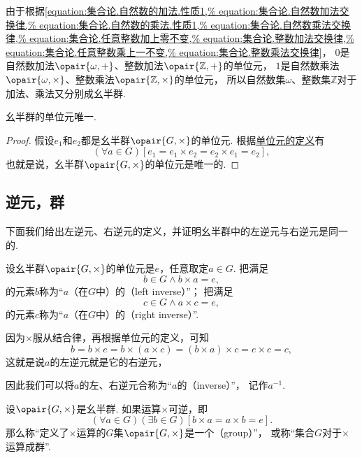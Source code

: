 由于根据\cref{equation:集合论.自然数的加法.性质1,%
equation:集合论.自然数加法交换律,%
equation:集合论.自然数的乘法.性质1,%
equation:集合论.自然数乘法交换律,%
equation:集合论.任意整数加上零不变,%
equation:集合论.整数加法交换律,%
equation:集合论.任意整数乘上一不变,%
equation:集合论.整数乘法交换律}，
\(0\)是自然数加法\(\opair{\omega,+}\)、整数加法\(\opair{\mathbb{Z},+}\)的单位元，
\(1\)是自然数乘法\(\opair{\omega,\times}\)、整数乘法\(\opair{\mathbb{Z},\times}\)的单位元，
所以自然数集\(\omega\)、整数集\(\mathbb{Z}\)对于加法、乘法又分别成幺半群.

\begin{theorem}\label{theorem:抽象代数.幺半群的单位元唯一}
幺半群的单位元唯一.
\begin{proof}
假设\(e_1\)和\(e_2\)都是幺半群\(\opair{G,\times}\)的单位元.
根据\hyperref[definition:抽象代数.幺半群的定义]{单位元的定义}有\[
	(\forall a \in G)[
		e_1 = e_1 \times e_2 = e_2 \times e_1 = e_2
	],
\]
也就是说，幺半群\(\opair{G,\times}\)的单位元是唯一的.
\end{proof}
\end{theorem}

\subsection{逆元，群}
下面我们给出左逆元、右逆元的定义，并证明幺半群中的左逆元与右逆元是同一的.

设幺半群\(\opair{G,\times}\)的单位元是\(e\)，任意取定\(a \in G\).
把满足\[
	b \in G
	\land
	b \times a = e,
\]的元素\(b\)称为“\(a\)（在\(G\)中）的（left inverse）”；
把满足\[
	c \in G
	\land
	a \times c = e,
\]的元素\(c\)称为“\(a\)（在\(G\)中）的（right inverse）”.

因为\(\times\)服从结合律，再根据单位元的定义，可知\[
	b = b \times e = b \times (a \times c) = (b \times a) \times c = e \times c = c,
\]
这就是说\(a\)的左逆元就是它的右逆元，

因此我们可以将\(a\)的左、右逆元合称为“\(a\)的（inverse）”，
记作\(a^{-1}\).

\begin{definition}\label{definition:抽象代数.群的定义}
设\(\opair{G,\times}\)是幺半群.
如果运算\(\times\)可逆，即\[
	(\forall a \in G)(\exists b \in G)
	[b \times a = a \times b = e].
\]
那么称“定义了\(\times\)运算的\(G\)集\(\opair{G,\times}\)是一个（group）”，
或称“集合\(G\)对于\(\times\)运算成群”.
\end{definition}

